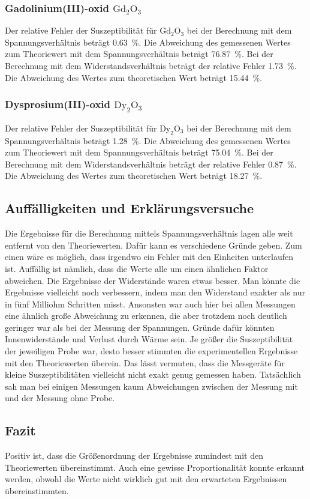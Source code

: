 \subsubsection{Gadolinium(III)-oxid $\text{Gd}_2 \text{O}_3$}
Der relative Fehler der Suszeptibilität für $\text{Gd}_2 \text{O}_3$ bei der Berechnung mit dem Spannungsverhältnis beträgt \SI{0.63}{\percent}. 
Die Abweichung des gemessenen Wertes zum Theoriewert mit dem Spannungsverhältnis beträgt \SI{76.87}{\percent}.
\newline
Bei der Berechnung mit dem Widerstandsverhältnis beträgt der relative Fehler \SI{1.73}{\percent}.
Die Abweichung des Wertes zum theoretischen Wert beträgt \SI{15.44}{\percent}.

\subsubsection{Dysprosium(III)-oxid $\text{Dy}_2 \text{O}_3$}
Der relative Fehler der Suszeptibilität für $\text{Dy}_2 \text{O}_3$ bei der Berechnung mit dem Spannungsverhältnis beträgt \SI{1.28}{\percent}. 
Die Abweichung des gemessenen Wertes zum Theoriewert mit dem Spannungsverhältnis beträgt \SI{75.04}{\percent}.
\newline
Bei der Berechnung mit dem Widerstandsverhältnis beträgt der relative Fehler \SI{0.87}{\percent}.
Die Abweichung des Wertes zum theoretischen Wert beträgt \SI{18.27}{\percent}.


\subsection{Auffälligkeiten und Erklärungsversuche}
Die Ergebnisse für die Berechnung mittels Spannungsverhältnis lagen alle weit entfernt von den Theoriewerten. Dafür kann es verschiedene Gründe geben. Zum einen wäre es 
möglich, dass irgendwo ein Fehler mit den Einheiten unterlaufen ist. %
Auffällig ist nämlich, dass die Werte alle um einen ähnlichen Faktor abweichen. 
\newline
Die Ergebnisse der Widerstände waren etwas besser. Man könnte die Ergebnisse vielleicht noch verbessern, indem man den Widerstand exakter als 
nur in fünf Milliohm Schritten misst. Ansonsten war auch hier bei allen Messungen eine ähnlich große Abweichung zu erkennen, die aber 
trotzdem noch deutlich geringer war als bei der Messung der Spannungen. Gründe dafür könnten Innenwiderstände und Verlust durch Wärme sein. 
\newline
Je größer die Suszeptibilität der jeweiligen Probe war, desto besser stimmten die experimentellen Ergebnisse mit den Theoriewerten überein. 
Das lässt vermuten, dass die Messgeräte für kleine Suszeptibilitäten vielleicht nicht exakt genug gemessen haben. Tatsächlich sah man bei 
einigen Messungen kaum Abweichungen zwischen der Messung mit und der Messung ohne Probe. 

\subsection{Fazit}
Positiv ist, dass die Größenordnung der Ergebnisse zumindest mit den Theoriewerten übereinstimmt. Auch eine gewisse  Proportionalität konnte 
erkannt werden, obwohl die Werte nicht wirklich gut mit den erwarteten Ergebnissen übereinstimmten.
